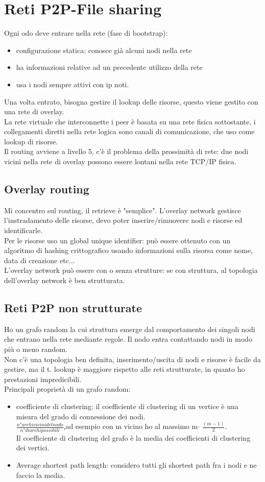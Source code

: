 \documentclass[16px]{article}
\begin{document}
\section{Reti P2P-File sharing}
Ogni odo deve entrare nella rete (fase di bootstrap):
\begin{itemize}
\item configurazione statica: conosce già alcuni nodi nella rete
\item ha informazioni relative ad un precedente utilizzo della rete
\item usa i nodi sempre attivi con ip noti.
\end{itemize}
Una volta entrato, bisogna gestire il lookup delle risorse, questo viene gestito con una rete di overlay.\\ La rete virtuale che interconnette i peer è basata su una rete fisica sottostante, i collegamenti diretti nella rete logica sono canali di comunicazione, che uso come lookup di risorse.\\ Il routing avviene a livello 5, c'è il problema della prossimità di rete: due nodi vicini nella rete di overlay possono essere lontani nella rete TCP/IP fisica.
\subsection{Overlay routing}
Mi concentro sul routing, il retrieve è "semplice". L'overlay network  gestisce l'instradamento delle risorse, devo poter inserire/rimuovere nodi e risorse ed identificarle.\\ Per le risorse uso un global unique identifier: può essere ottenuto con un algoritmo di hashing crittografico usando informazioni sulla risorsa come nome, data di creazione etc...\\ L'overlay network può essere con o senza strutture: se con struttura, al topologia dell'overlay network è ben strutturata.
\subsection{Reti P2P non strutturate}
Ho un grafo random la cui struttura emerge dal comportamento dei singoli nodi che entrano nella rete mediante regole. Il nodo entra contattando nodi in modo più o meno random.\\ Non c'è una topologia ben definita, inserimento/uscita di nodi e risorse è facile da gestire, ma il t. lookup è maggiore rispetto alle reti strutturate, in quanto ho prestazioni impredicibili.\\Principali proprietà di un grafo random:
\begin{itemize}
\item coefficiente di clustering: il coefficiente di clustering di un vertice è una misura del grado di connessione dei nodi.\\ $\frac{n° archi vicini del nodo}{n° di archi possibili}$,ad esempio con m vicino ho al massimo m$\cdot$ $\frac{(m-1)}{2}$.\\ Il coefficiente di clustering del grafo è la media dei coefficienti di clustering dei vertici.
\item Average shortest path length: considero tutti gli shortest path fra i nodi e ne faccio la media.  
\end{itemize}
\end{document}
